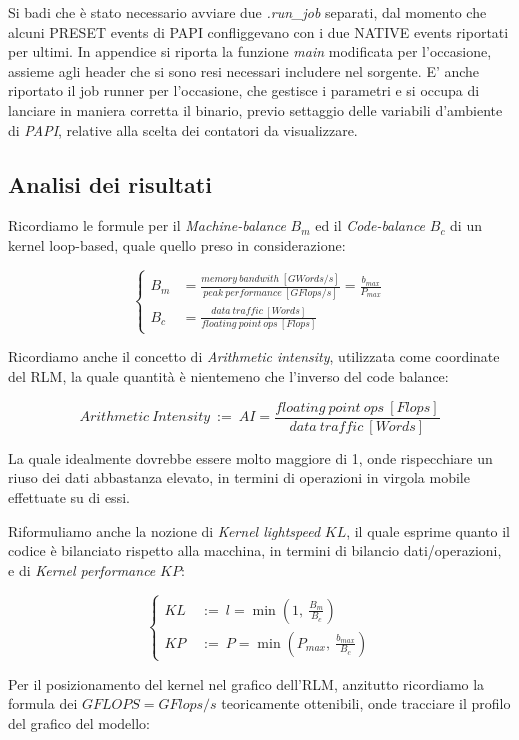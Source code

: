 Si badi che è stato necessario avviare due \textit{.run\_job} separati, dal momento che alcuni PRESET events di PAPI confliggevano con i due NATIVE events riportati per ultimi.
In appendice si riporta la funzione \textit{main} modificata per l'occasione, assieme agli header che si sono resi necessari includere nel sorgente. E' anche riportato il job runner per l'occasione, che gestisce i parametri e si occupa di lanciare in maniera corretta il binario, previo settaggio delle variabili d'ambiente di \emph{PAPI}, relative alla scelta dei contatori da visualizzare.

\subsection{Analisi dei risultati}

Ricordiamo le formule per il \textit{Machine-balance} $B_m$ ed il \textit{Code-balance} $B_c$ di un kernel loop-based, quale quello preso in considerazione:

\[
	\left\{
	\begin{aligned}
	B_m &= \frac{memory\ bandwith\ [GWords/s]}{peak\ performance\ [GFlops/s]} = \frac{b_{max}}{P_{max}}\\
	B_c &= \frac{data\ traffic\ [Words]}{floating\ point\ ops\ [Flops]}
	\end{aligned}
	\right.
\]

Ricordiamo anche il concetto di \textit{Arithmetic intensity}, utilizzata come coordinate del RLM, la quale quantità è nientemeno che l'inverso del code balance:

\[
	Arithmetic\ Intensity\ :=\ AI = \frac{floating\ point\ ops\ [Flops]}{data\ traffic\ [Words]}
\]

La quale idealmente dovrebbe essere molto maggiore di 1, onde rispecchiare un riuso dei dati abbastanza elevato, in termini di operazioni in virgola mobile effettuate su di essi.

Riformuliamo anche la nozione di \textit{Kernel lightspeed} $KL$, il quale esprime quanto il codice è bilanciato rispetto alla macchina, in termini di bilancio dati/operazioni, e di \textit{Kernel performance} $KP$:

\[
	\left\{
	\begin{aligned}
	KL\ &:=\ l = \min(1,\ \frac{B_m}{B_c})\\
	KP\ &:=\ P = \min(P_{max},\ \frac{b_{max}}{B_c})
	\end{aligned}
	\right.
\]

Per il posizionamento del kernel nel grafico dell'RLM, anzitutto ricordiamo la formula dei $GFLOPS = GFlops/s$ teoricamente ottenibili, onde tracciare il profilo del grafico del modello:

